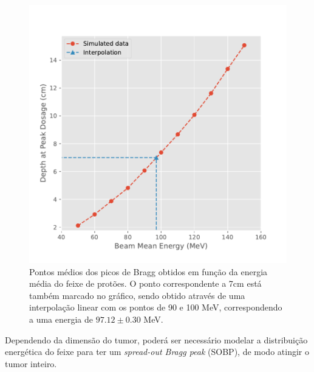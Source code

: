 \documentclass[a4paper, 12pt]{article} %
\begin{document}
	\begin{figure}[H]
		\centering
		\includegraphics[width=.5\linewidth]{bragg_peak_interp.pdf}
		\caption[Pontos médios dos picos de Bragg obtidos em função da energia média inicial do feixe de protões.]{Pontos médios dos picos de Bragg obtidos em função da energia média do feixe de protões. O ponto correspondente a 7cm está também marcado no gráfico, sendo obtido através de uma interpolação linear com os pontos de 90 e 100 MeV, correspondendo a uma energia de $97.12 \pm 0.30$ MeV\footnotemark. }
		\label{fig:bragg_peak_adjusted}
	\end{figure}
	Dependendo da dimensão do tumor, poderá ser necessário modelar a distribuição energética do feixe para ter um \textit{spread-out Bragg peak} (SOBP), de modo atingir o tumor inteiro.

	
	
\end{document}
